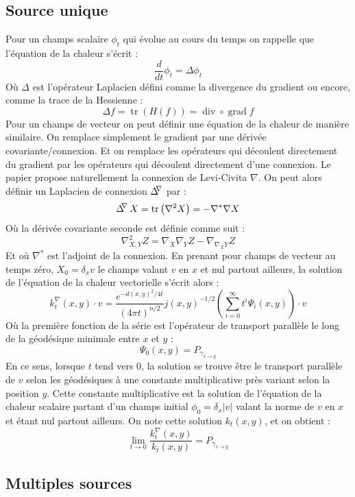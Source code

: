 \documentclass[11pt]{article}
\DeclareMathOperator{\trace}{tr}
\DeclareMathOperator{\grad}{grad}
\DeclareMathOperator{\divergence}{div}
\DeclareMathOperator{\connexionLaplacian}{\Delta^{\hspace{-3pt} \nabla}}
\begin{document}
	\subsection{Source unique}
	Pour un champs scalaire $\phi_t$ qui évolue au cours du temps on rappelle que l'équation de la chaleur s'écrit :
	$$ \frac{d}{dt} \phi_t = \Delta \phi_t $$
	Où $\Delta$ est l'opérateur Laplacien défini comme la divergence du gradient ou encore, comme la trace de la Hessienne :
	$$ \Delta f = \trace \left( H(f) \right) = \divergence \circ \grad f $$
	Pour un champs de vecteur on peut définir une équation de la chaleur de manière similaire. On remplace simplement le gradient par une dérivée covariante/connexion. Et on remplace les opérateurs qui découlent directement du gradient par les opérateurs qui découlent directement d'une connexion. Le papier propose naturellement la connexion de Levi-Civita $\nabla$. On peut alors définir un Laplacien de connexion $\connexionLaplacian$ par :
	$$ \connexionLaplacian X = \trace \left( \nabla^2 X \right) = - \nabla^* \nabla X $$
	Où la dérivée covariante seconde est définie comme suit :
	$$ \nabla^2_{X, Y} Z = \nabla_X \nabla_Y Z - \nabla_{\nabla_X Y} Z $$
	Et où $\nabla^*$ est l'adjoint de la connexion.
	En prenant pour champs de vecteur au temps zéro, $X_0 = \delta_x v$ le champs valant $v$ en $x$ et nul partout ailleurs, la solution de l'équation de la chaleur vectorielle s'écrit alors :
	$$ k_t^\nabla(x, y) \cdot v = \frac{e^{-d(x, y)^2 / 4t}}{(4 \pi t)^{n/2}} j(x, y)^{-1/2} \left( \sum_{i=0}^\infty t^i \Psi_i(x, y) \right) \cdot v $$
	Où la première fonction de la série est l'opérateur de transport parallèle le long de la géodésique minimale entre $x$ et $y$ :
	$$ \Psi_0(x, y) = P_{\gamma_{x \rightarrow y}} $$
	En ce sens, lorsque $t$ tend vers 0, la solution se trouve être le transport parallèle de $v$ selon les géodésiques à une constante multiplicative près variant selon la position $y$. Cette constante multiplicative est la solution de l'équation de la chaleur scalaire partant d'un champs initial $\phi_0 = \delta_x |v|$ valant la norme de $v$ en $x$ et étant nul partout ailleurs. On note cette solution $k_t(x, y)$, et on obtient :
	$$ \lim_{t \rightarrow 0} \frac{k_t^\nabla(x, y)}{k_t(x, y)} = P_{\gamma_{x \rightarrow y}} $$
	
	\subsection{Multiples sources}
	
\end{document}
